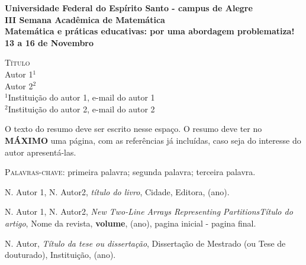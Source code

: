 \documentclass[12pt]{amsart}
\begin{document}
\thispagestyle{empty}

\begin{center}
{\bf Universidade Federal do Espírito Santo - campus de Alegre}
\vspace*{0.2cm}\\
{\bf III Semana Acadêmica de Matemática }
\vspace*{0.2cm}\\
\textbf{Matemática e práticas educativas: por uma abordagem problematiza!}
\vspace*{0.2cm}\\
{\bf 13 a 16 de Novembro}
\end{center}



\vspace*{0.8cm}

\begin{center}
{\large \textsc{Título}}\\
\vspace{0.8cm}
Autor 1$^{1}$\\
Autor 2$^{2}$\\ %
{\small $^{1}$Instituição do autor 1, e-mail do autor 1}\\
{\small $^{2}$Instituição do autor 2, e-mail do autor 2}

\end{center}


\vspace*{0.8cm}
\linespread{1.3} 



\noindent O texto do resumo deve ser escrito nesse espaço. O resumo deve ter no \textbf{MÁXIMO} uma página,  com as referências já incluídas, caso seja do interesse do autor apresentá-las.


\bigskip
\bigskip
\noindent\textsc{Palavras-chave:} primeira palavra; segunda palavra; terceira palavra.






\vspace{0.3cm} %

\begin{thebibliography}{xx}


 {\sc N. Autor 1, N. Autor2}, {\it título do livro}, Cidade, Editora, (ano).

 {\sc N. Autor 1, N. Autor2}, {\it New Two-Line Arrays Representing PartitionsTítulo do artigo}, Nome da revista, {\bf volume}, (ano), pagina inicial - pagina final.

 {\sc N. Autor}, {\it Título da tese ou dissertação}, Dissertação de Mestrado (ou Tese de douturado), Instituição, (ano).


\end{thebibliography}
\end{document}
